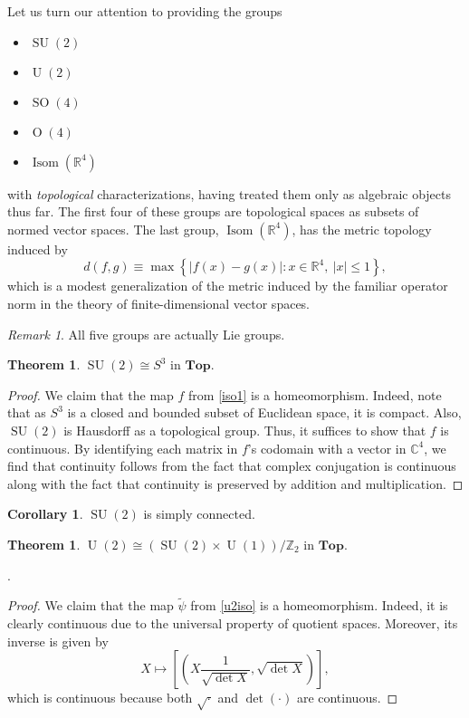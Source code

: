 \documentclass[10pt,letterpaper,cm]{nupset}
\theoremstyle{definition}
\theoremstyle{theorem}
\newtheorem{theorem}[definition]{Theorem}
\newtheorem{cor}[definition]{Corollary}
\theoremstyle{remark}
\newtheorem{remark}[definition]{Remark}
\newcommand{\C}{\mathbb C}
\newcommand{\R}{\mathbb R}
\newcommand{\Z}{\mathbb Z}
\newcommand{\1}{\mathbf{1}}
\newcommand{\0}{\vec {0}}
\DeclareMathOperator{\ORT}{O}
\DeclareMathOperator{\Isom}{Isom}
\DeclareMathOperator{\SO}{SO}
\DeclareMathOperator{\SU}{SU}
\DeclareMathOperator{\U}{U}
\begin{document}
Let us turn our attention to providing the groups
\begin{itemize}
\item $\SU(2)$
\item $\U(2)$
\item $\SO(4)$
\item $\ORT(4)$
\item $\Isom(\R^4)$
\end{itemize}
with \emph{topological} characterizations, having treated them only as algebraic objects thus far. The first four of these groups are topological spaces as subsets of normed vector spaces. The last group, $\Isom(\R^4)$, has the metric topology induced by
\[
d(f,g) \equiv \max\left\{ \left\lvert{f(x)-g(x)}\right\rvert : x \in \R^4,\ \left\lvert{x}\right\rvert \leq 1\right\},
\]  which is a modest generalization of the metric induced by the familiar operator norm in the theory of finite-dimensional vector spaces.
\begin{remark}
All five groups are actually Lie groups.
\end{remark}

\smallskip

\begin{theorem}
$\SU(2) \cong S^3$ in $\mathbf{Top}$. 
\end{theorem}

\begin{proof}
We claim that the map $f$ from \cref{iso1} is a homeomorphism. Indeed, note that as $S^3$ is a closed and bounded subset of Euclidean space, it is compact. Also, $\SU(2)$ is Hausdorff as a topological group. Thus, it suffices to show that $f$ is continuous. By identifying each matrix in $f$'s codomain with a vector in $\C^4$, we find that continuity follows from the fact that complex conjugation is continuous along with the fact that continuity is preserved by addition and multiplication. 
\end{proof}

\begin{cor}
$\SU(2)$ is simply connected.
\end{cor}

\medskip

\begin{theorem}
 $\U(2)\cong \left(\SU(2)\times \U(1)\right)/\Z_2$ in $\mathbf{Top}$.
\end{theorem}.
\begin{proof}
We claim that the map $\tilde{\psi}$ from \cref{u2iso} is a homeomorphism. Indeed, it is clearly continuous due to the universal property of quotient spaces. Moreover, its inverse is given by 
\[
X\mapsto \left[\left(X\frac{1}{\sqrt{\det{X}}}, \sqrt{\det{X}}\right)\right]
,\] which is continuous because both $\sqrt{\cdot}$ and $\det(\cdot)$ are continuous.
\end{proof}
\end{document}
